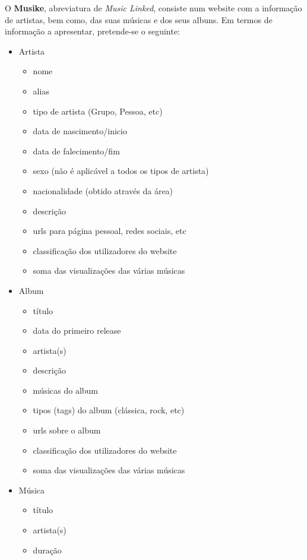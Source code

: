 \documentclass{article}
\begin{document}
O \textbf{Musike}, abreviatura de \textit{Music Linked}, consiste num website com a informação de artistas, bem como, das suas músicas e dos seus albuns. Em termos de informação a apresentar, pretende-se o seguinte:
\begin{itemize}
    \item Artista
        \begin{itemize}
            \item nome
            \item alias
            \item tipo de artista (Grupo, Pessoa, etc)
            \item data de nascimento/inicio
            \item data de falecimento/fim
            \item sexo (não é aplicável a todos os tipos de artista)
            \item nacionalidade (obtido através da área)
            \item descrição
            \item urls para página pessoal, redes sociais, etc
            \item classificação dos utilizadores do website
            \item soma das visualizações das várias músicas
        \end{itemize}
    \item Album
        \begin{itemize}
            \item título
            \item data do primeiro release
            \item artista(s)
            \item descrição
            \item músicas do album
            \item tipos (tags) do album (clássica, rock, etc)
            \item urls sobre o album
            \item classificação dos utilizadores do website
            \item soma das visualizações das várias músicas
        \end{itemize}
    \item Música
        \begin{itemize}
            \item título
            \item artista(s)
            \item duração

\end{itemize}
\end{itemize}
\end{document}
